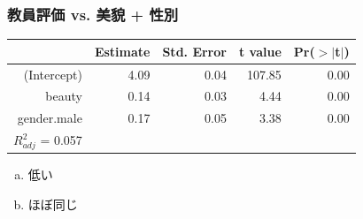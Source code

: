 \begin{frame}[fragile]
\frametitle{教員評価 vs. 美貌 + 性別}


{\small
\begin{center}
\begin{tabular}{rrrrr}
  \hline
 & Estimate & Std. Error & t value & Pr($>$$|$t$|$) \\
  \hline
(Intercept) & 4.09 & 0.04 & 107.85 & 0.00 \\
  beauty & 0.14 & 0.03 & 4.44 & 0.00 \\
  gender.male & 0.17 & 0.05 & 3.38 & 0.00 \\
   \hline
$R^2_{adj}$ = 0.057
\end{tabular}
\end{center}
}

\begin{enumerate}[(a)]
 
\item 低い
\item ほぼ同じ
\end{enumerate}

\end{frame}


